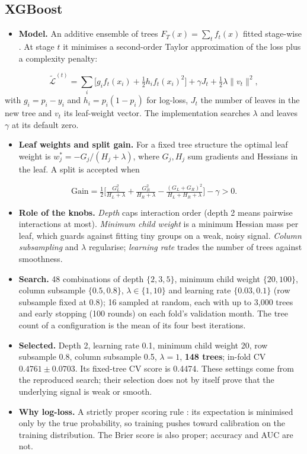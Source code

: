 \documentclass[conference]{IEEEtran}
\begin{document}
\subsection{XGBoost}
\begin{itemize}
\item \textbf{Model.} An additive ensemble of trees $F_T(x)=\sum_t f_t(x)$ fitted stage-wise \cite{friedman2001gbm,chen2016xgboost}. At stage $t$ it minimises a second-order Taylor approximation of the loss plus a complexity penalty:
\end{itemize}
\[
\tilde{\mathcal L}^{(t)}=\textstyle\sum_i\big[g_if_t(x_i)+\tfrac12h_if_t(x_i)^2\big]+\gamma J_t+\tfrac12\lambda\lVert v_t\rVert^2 ,
\]
with $g_i=p_i-y_i$ and $h_i=p_i(1-p_i)$ for log-loss, $J_t$ the number of leaves in the new tree and $v_t$ its leaf-weight vector. The implementation searches $\lambda$ and leaves $\gamma$ at its default zero.
\begin{itemize}
\item \textbf{Leaf weights and split gain.} For a fixed tree structure the optimal leaf weight is $w_j^*=-G_j/(H_j+\lambda)$, where $G_j,H_j$ sum gradients and Hessians in the leaf. A split is accepted when
\end{itemize}
\[
\text{Gain}=\tfrac12\Big[\tfrac{G_L^2}{H_L+\lambda}+\tfrac{G_R^2}{H_R+\lambda}-\tfrac{(G_L+G_R)^2}{H_L+H_R+\lambda}\Big]-\gamma>0 .
\]
\begin{itemize}
\item \textbf{Role of the knobs.} \emph{Depth} caps interaction order (depth 2 means pairwise interactions at most). \emph{Minimum child weight} is a minimum Hessian mass per leaf, which guards against fitting tiny groups on a weak, noisy signal. \emph{Column subsampling} and $\lambda$ regularise; \emph{learning rate} trades the number of trees against smoothness.
\item \textbf{Search.} 48 combinations of depth $\{2,3,5\}$, minimum child weight $\{20,100\}$, column subsample $\{0.5,0.8\}$, $\lambda\in\{1,10\}$ and learning rate $\{0.03,0.1\}$ (row subsample fixed at 0.8); 16 sampled at random, each with up to 3{,}000 trees and early stopping (100 rounds) on each fold's validation month. The tree count of a configuration is the mean of its four best iterations.
\item \textbf{Selected.} Depth 2, learning rate 0.1, minimum child weight 20, row subsample 0.8, column subsample 0.5, $\lambda=1$, \textbf{148 trees}; in-fold CV $0.4761\pm0.0703$. Its fixed-tree CV score is 0.4474. These settings come from the reproduced search; their selection does not by itself prove that the underlying signal is weak or smooth.
\item \textbf{Why log-loss.} A strictly proper scoring rule \cite{gneiting2007scoring}: its expectation is minimised only by the true probability, so training pushes toward calibration on the training distribution. The Brier score \cite{brier1950} is also proper; accuracy and AUC are not.
\end{itemize}
\end{document}
